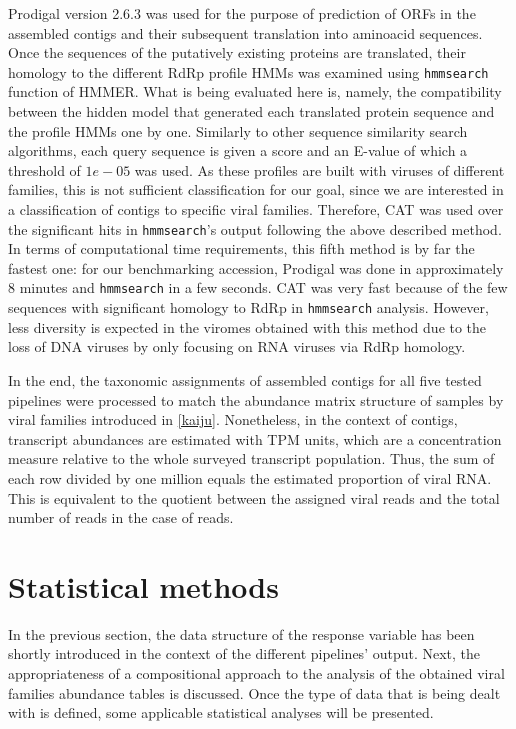 \documentclass[
  openany]{book}
\begin{document}
Prodigal version 2.6.3 was used for the purpose of prediction of ORFs in the assembled contigs and their subsequent translation into aminoacid sequences. Once the sequences of the putatively existing proteins are translated, their homology to the different RdRp profile HMMs was examined using \texttt{hmmsearch} function of HMMER. What is being evaluated here is, namely, the compatibility between the hidden model that generated each translated protein sequence and the profile HMMs one by one. Similarly to other sequence similarity search algorithms, each query sequence is given a score and an E-value of which a threshold of \(1e-05\) was used. As these profiles are built with viruses of different families, this is not sufficient classification for our goal, since we are interested in a classification of contigs to specific viral families. Therefore, CAT was used over the significant hits in \texttt{hmmsearch}'s output following the above described method. In terms of computational time requirements, this fifth method is by far the fastest one: for our benchmarking accession, Prodigal was done in approximately 8 minutes and \texttt{hmmsearch} in a few seconds. CAT was very fast because of the few sequences with significant homology to RdRp in \texttt{hmmsearch} analysis. However, less diversity is expected in the viromes obtained with this method due to the loss of DNA viruses by only focusing on RNA viruses via RdRp homology.

In the end, the taxonomic assignments of assembled contigs for all five tested pipelines were processed to match the abundance matrix structure of samples by viral families introduced in \ref{kaiju}. Nonetheless, in the context of contigs, transcript abundances are estimated with TPM units, which are a concentration measure relative to the whole surveyed transcript population. Thus, the sum of each row divided by one million equals the estimated proportion of viral RNA. This is equivalent to the quotient between the assigned viral reads and the total number of reads in the case of reads.

\hypertarget{pilot-stat}{%
\section{Statistical methods}\label{pilot-stat}}

In the previous section, the data structure of the response variable has been shortly introduced in the context of the different pipelines' output. Next, the appropriateness of a compositional approach to the analysis of the obtained viral families abundance tables is discussed. Once the type of data that is being dealt with is defined, some applicable statistical analyses will be presented.
\end{document}
